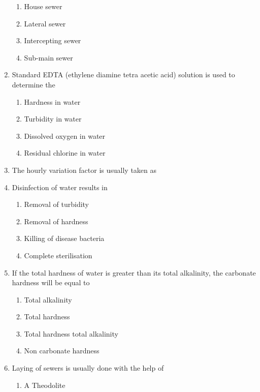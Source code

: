 \documentclass[11pt,a4paper]{article}
\begin{document}
\begin{enumerate}
\begin{enumerate}[label=\Alph*.]
\item{House sewer}
\item{Lateral sewer}
\item{Intercepting sewer}
\item{Sub-main sewer}
\end{enumerate}
\item{Standard EDTA (ethylene diamine tetra acetic acid) solution is used to determine the}
\begin{enumerate}[label=\Alph*.]
\item{Hardness in water}
\item{Turbidity in water}
\item{Dissolved oxygen in water}
\item{Residual chlorine in water}
\end{enumerate}
\item{The hourly variation factor is usually taken as}
\\
\item{Disinfection of water results in}
\begin{enumerate}[label=\Alph*.]
\item{Removal of turbidity}
\item{Removal of hardness}
\item{Killing of disease bacteria}
\item{Complete sterilisation}
\end{enumerate}
\item{If the total hardness of water is greater than its total alkalinity, the carbonate hardness will be equal to}
\begin{enumerate}[label=\Alph*.]
\item{Total alkalinity}
\item{Total hardness}
\item{Total hardness total alkalinity}
\item{Non carbonate hardness}
\end{enumerate}
\item{Laying of sewers is usually done with the help of}
\begin{enumerate}[label=\Alph*.]
\item{A Theodolite}

\end{enumerate}
\end{enumerate}
\end{document}
